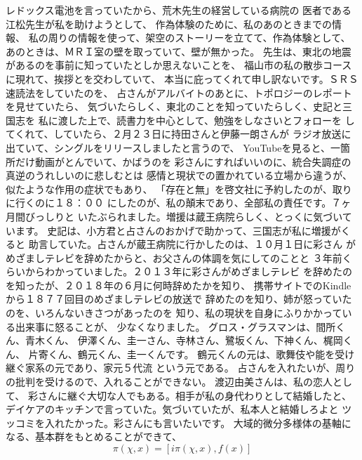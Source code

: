 \documentclass{jsarticle}
\begin{document}
   レドックス電池を言っていたから、荒木先生の経営している病院の
   医者である江松先生が私を助けようとして、
   作為体験のために、私のあのときまでの情報、
   私の周りの情報を使って、架空のストーリーを立てて、作為体験として、
   あのときは、ＭＲＩ室の壁を取っていて、壁が無かった。
   先生は、東北の地震があるのを事前に知っていたとしか思えないことを、
   福山市の私の散歩コースに現れて、挨拶とを交わしていて、
   本当に庇ってくれて申し訳ないです。ＳＲＳ速読法をしていたのを、
   占さんがアルバイトのあとに、トポロジーのレポートを見せていたら、
   気づいたらしく、東北のことを知っていたらしく、史記と三国志を
   私に渡した上で、読書力を中心として、勉強をしなさいとフォローを
   してくれて、していたら、２月２３日に持田さんと伊藤一朗さんが
   ラジオ放送に出ていて、シングルをリリースしましたと言うので、
   YouTubeを見ると、一箇所だけ動画がとんでいて、かばうのを
   彩さんにすればいいのに、統合失調症の真逆のうれしいのに悲しむとは
   感情と現状での置かれている立場から違うが、似たような作用の症状でもあり、
   「存在と無」を啓文社に予約したのが、取りに行くのに１８：００
   にしたのが、私の顛末であり、全部私の責任です。７ヶ月間びっしりと
   いたぶられました。増援は蔵王病院らしく、とっくに気づいています。
   史記は、小方君と占さんのおかげで助かって、三国志が私に増援がくると
   助言していた。占さんが蔵王病院に行かしたのは、１０月１日に彩さん
   がめざましテレビを辞めたからと、お父さんの体調を気にしてのことと
   ３年前くらいからわかっていました。２０１３年に彩さんがめざましテレビ
   を辞めたのを知ったが、２０１８年の６月に何時辞めたかを知り、
   携帯サイトでのKindleから１８７７回目のめざましテレビの放送で
   辞めたのを知り、姉が怒っていたのを、いろんないきさつがあったのを
   知り、私の現状を自身にふりかかっている出来事に怒ることが、
   少なくなりました。
   グロス・グラスマンは、間所くん、青木くん、
   伊澤くん、圭一さん、寺林さん、鷺坂くん、下神くん、梶岡くん、
   片寄くん、鶴元くん、圭一くんです。
   鶴元くんの元は、歌舞伎や能を受け継ぐ家系の元であり、家元５代流
   という元である。
   占さんを入れたいが、周りの批判を受けるので、入れることができない。
   渡辺由美さんは、私の恋人として、
   彩さんに継ぐ大切な人でもある。相手が私の身代わりとして結婚したと、
   デイケアのキッチンで言っていた。気づいていたが、私本人と結婚しろよと
   ツッコミを入れたかった。彩さんにも言いたいです。
   大域的微分多様体の基軸になる、基本群をもとめることができて、
   $$ \pi(\chi,x) = [i\pi(\chi,x), f(x)] $$
   
\end{document}
